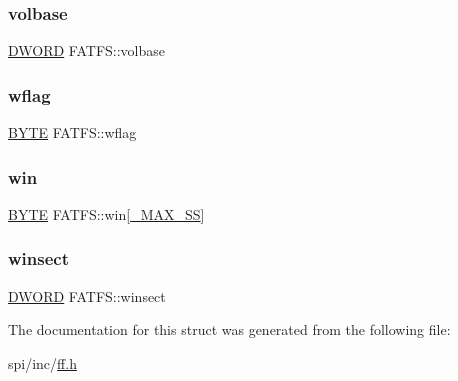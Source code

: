 \subsubsection{\texorpdfstring{volbase}{volbase}}
{\footnotesize\ttfamily \mbox{\hyperlink{integer_8h_ad342ac907eb044443153a22f964bf0af}{D\+W\+O\+RD}} F\+A\+T\+F\+S\+::volbase}

\mbox{\label{struct_f_a_t_f_s_a647e43c9ccae94b7274793d1909897de}} 
\subsubsection{\texorpdfstring{wflag}{wflag}}
{\footnotesize\ttfamily \mbox{\hyperlink{lz4_8c_a4ae1dab0fb4b072a66584546209e7d58}{B\+Y\+TE}} F\+A\+T\+F\+S\+::wflag}

\mbox{\label{struct_f_a_t_f_s_a7cc35a593465e727ab87723c14610644}} 
\subsubsection{\texorpdfstring{win}{win}}
{\footnotesize\ttfamily \mbox{\hyperlink{lz4_8c_a4ae1dab0fb4b072a66584546209e7d58}{B\+Y\+TE}} F\+A\+T\+F\+S\+::win\mbox{[}\mbox{\hyperlink{ffconf_8h_ac271b697378912f17132cb9c7d0de024}{\+\_\+\+M\+A\+X\+\_\+\+SS}}\mbox{]}}

\mbox{\label{struct_f_a_t_f_s_ac60e69c00e6bf7c25febfbac4dc1476b}} 
\subsubsection{\texorpdfstring{winsect}{winsect}}
{\footnotesize\ttfamily \mbox{\hyperlink{integer_8h_ad342ac907eb044443153a22f964bf0af}{D\+W\+O\+RD}} F\+A\+T\+F\+S\+::winsect}



The documentation for this struct was generated from the following file\+:\begin{DoxyCompactItemize}
\item 
spi/inc/\mbox{\hyperlink{ff_8h}{ff.\+h}}\end{DoxyCompactItemize}
